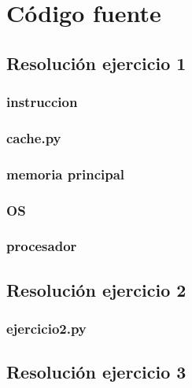 \documentclass[11pt,a4paper]{article}
\begin{document}
\newpage
\appendix
\section{Código fuente}\label{appendix_codigo_fuente}

	\subsection{Resolución ejercicio 1}\label{ejercicio_1}
		\subsubsection{instruccion}
			
		\subsubsection{cache.py}
			
		\subsubsection{memoria principal}
			
		\subsubsection{OS}
			
		\subsubsection{procesador}
			

	\newpage

	\subsection{Resolución ejercicio 2}\label{ejercicio_2}
		\subsubsection{ejercicio2.py}

	\newpage

	\subsection{Resolución ejercicio 3}\label{ejercicio_3}
\end{document}
